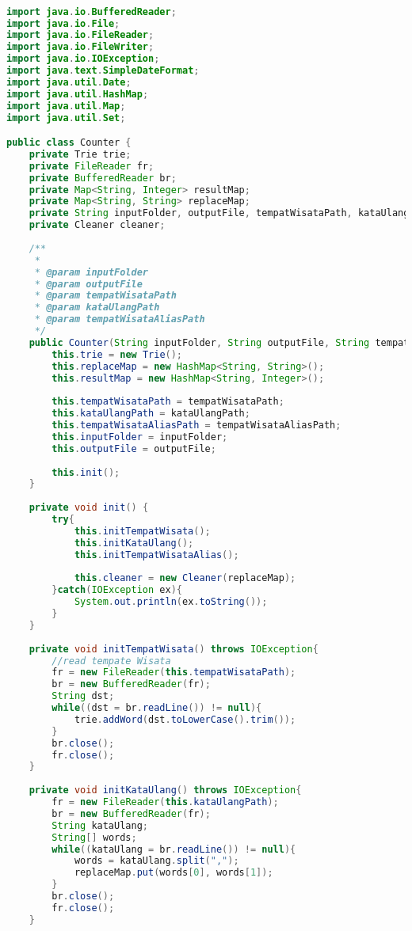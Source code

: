 \begin{lstlisting}[language=Java,basicstyle=\tiny,caption=Counter.java]

import java.io.BufferedReader;
import java.io.File;
import java.io.FileReader;
import java.io.FileWriter;
import java.io.IOException;
import java.text.SimpleDateFormat;
import java.util.Date;
import java.util.HashMap;
import java.util.Map;
import java.util.Set;

public class Counter {
    private Trie trie;
    private FileReader fr;
    private BufferedReader br;
    private Map<String, Integer> resultMap;
    private Map<String, String> replaceMap;
    private String inputFolder, outputFile, tempatWisataPath, kataUlangPath, tempatWisataAliasPath;
    private Cleaner cleaner;
    
    /**
     * 
     * @param inputFolder
     * @param outputFile
     * @param tempatWisataPath
     * @param kataUlangPath
     * @param tempatWisataAliasPath 
     */
    public Counter(String inputFolder, String outputFile, String tempatWisataPath, String kataUlangPath, String tempatWisataAliasPath){
        this.trie = new Trie();
        this.replaceMap = new HashMap<String, String>();
        this.resultMap = new HashMap<String, Integer>();
        
        this.tempatWisataPath = tempatWisataPath;
        this.kataUlangPath = kataUlangPath;
        this.tempatWisataAliasPath = tempatWisataAliasPath;
        this.inputFolder = inputFolder;
        this.outputFile = outputFile;
        
        this.init();
    }
    
    private void init() {
        try{
            this.initTempatWisata();
            this.initKataUlang();
            this.initTempatWisataAlias();
            
            this.cleaner = new Cleaner(replaceMap);
        }catch(IOException ex){
            System.out.println(ex.toString());
        }
    }
    
    private void initTempatWisata() throws IOException{
        //read tempate Wisata
        fr = new FileReader(this.tempatWisataPath);
        br = new BufferedReader(fr);
        String dst;
        while((dst = br.readLine()) != null){
            trie.addWord(dst.toLowerCase().trim());
        }
        br.close();
        fr.close();
    }
    
    private void initKataUlang() throws IOException{
        fr = new FileReader(this.kataUlangPath);
        br = new BufferedReader(fr);
        String kataUlang;
        String[] words;
        while((kataUlang = br.readLine()) != null){
            words = kataUlang.split(",");
            replaceMap.put(words[0], words[1]);
        }
        br.close();
        fr.close();
    }
    

\end{lstlisting}
